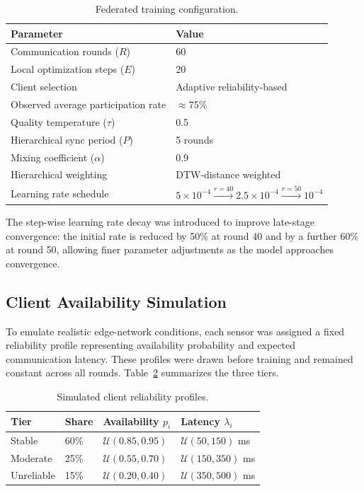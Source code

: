 \begin{table}[H]
\centering
\caption{Federated training configuration.}
\label{tab:fl_config}
\begin{tabular}{ll}
\hline
\textbf{Parameter} & \textbf{Value} \\
\hline
Communication rounds ($R$) & 60 \\
Local optimization steps ($E$) & 20 \\
Client selection & Adaptive reliability-based \\
Observed average participation rate & $\approx$75\% \\
Quality temperature ($\tau$) & 0.5 \\
Hierarchical sync period ($P$) & 5 rounds \\
Mixing coefficient ($\alpha$) & 0.9 \\
Hierarchical weighting & DTW-distance weighted \\
Learning rate schedule & $5{\times}10^{-4} \xrightarrow{r=40} 2.5{\times}10^{-4} \xrightarrow{r=50} 10^{-4}$ \\
\hline
\end{tabular}
\end{table}

The step-wise learning rate decay was introduced to improve late-stage convergence: the initial rate is reduced by 50\% at round 40 and by a further 60\% at round 50, allowing finer parameter adjustments as the model approaches convergence.

\subsection{Client Availability Simulation}

To emulate realistic edge-network conditions, each sensor was assigned a fixed reliability profile representing availability probability and expected communication latency. These profiles were drawn before training and remained constant across all rounds. Table~\ref{tab:client_profiles} summarizes the three tiers.

\begin{table}[H]
\centering
\caption{Simulated client reliability profiles.}
\label{tab:client_profiles}
\begin{tabular}{llll}
\hline
\textbf{Tier} & \textbf{Share} & \textbf{Availability $p_i$} & \textbf{Latency $\lambda_i$} \\
\hline
Stable & 60\% & $\mathcal{U}(0.85, 0.95)$ & $\mathcal{U}(50, 150)$ ms \\
Moderate & 25\% & $\mathcal{U}(0.55, 0.70)$ & $\mathcal{U}(150, 350)$ ms \\
Unreliable & 15\% & $\mathcal{U}(0.20, 0.40)$ & $\mathcal{U}(350, 500)$ ms \\
\hline
\end{tabular}
\end{table}

